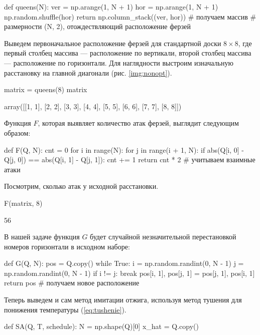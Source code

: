 \begin{pyin}
def queens(N):
  ver = np.arange(1, N + 1)
  hor = np.arange(1, N + 1)
  np.random.shuffle(hor)
  return np.column_stack((ver, hor)) # получаем массив
  # размерности (N, 2), отождествляющий расположение ферзей
\end{pyin}

Выведем первоначальное расположение ферзей для стандартной доски $8 \times 8$, где первый столбец массива — расположение по вертикали, второй столбец массива — расположение по горизонтали. Для наглядности выстроим изначальную расстановку на главной диагонали (рис. \ref{img:nonopt}).


\begin{pyin}
matrix = queens(8)
matrix
\end{pyin}

\begin{pyout}
array([[1, 1],
       [2, 2],
       [3, 3],
       [4, 4],
       [5, 5],
       [6, 6],
       [7, 7],
       [8, 8]])
\end{pyout}


Функция $F$, которая выявляет количество атак ферзей, выглядит следующим образом:
\begin{pyin}
def F(Q, N):
  cnt = 0
  for i in range(N):
     for j in range(i + 1, N):
         if abs(Q[i, 0] - Q[j, 0]) == abs(Q[i, 1] - Q[j, 1]):
             cnt += 1
  return cnt * 2 # учитываем взаимные атаки
\end{pyin}

Посмотрим, сколько атак у исходной расстановки.
\begin{pyin}
F(matrix, 8)
\end{pyin}

\begin{pyout}
56
\end{pyout}

В нашей задаче функция $G$ будет случайной незначительной перестановкой номеров горизонтали в исходном наборе:

\begin{pyin}
def G(Q, N):
  pos = Q.copy()
  while True:
     i = np.random.randint(0, N - 1)
     j = np.random.randint(0, N - 1)
     if i != j:
        break
  pos[i, 1], pos[j, 1] = pos[j, 1], pos[i, 1]
  return pos # получаем новое расположение
\end{pyin}

Теперь выведем и сам метод имитации отжига, используя метод тушения для понижения температуры (\ref{eq:tushenie}).

\begin{pyin}
def SA(Q, T, schedule):
  N = np.shape(Q)[0]
  x_hat = Q.copy()
\end{pyin}

